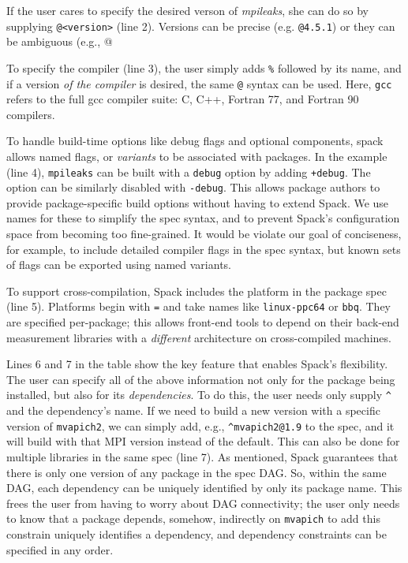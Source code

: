 \noindent
If the user cares to specify the desired verson of {\it mpileaks}, she can do so
by supplying {\tt @<version>} (line 2). Versions can be precise (e.g. {\tt @4.5.1}) or 
they can be ambiguous (e.g., @

To specify the compiler (line 3), the user
simply adds {\tt \%} followed by its name, and if a version {\it of the compiler} 
is desired, the same {\tt @} syntax can be used.  Here, {\tt gcc} refers to the full
gcc compiler suite: C, C++, Fortran 77, and Fortran 90 compilers.

To handle build-time options like debug flags and optional components, spack
allows named flags, or {\it variants} to be associated with packages.  
In the example (line 4), {\tt mpileaks} can be built with a {\tt debug} option by
adding {\tt +debug}.  The option can be similarly disabled with {\tt -debug}.  
This allows package authors to provide package-specific build options without 
having to extend Spack.  We use names for these to simplify the spec
syntax, and to prevent Spack's configuration space from becoming too fine-grained.
It would be violate our goal of conciseness, for example, to include detailed 
compiler flags in the spec syntax, but known sets of flags can be exported using
named variants.

To support cross-compilation, Spack includes the platform in the package spec (line 5).
Platforms begin with {\tt =} and take names like {\tt linux-ppc64} or {\tt bbq}.  They are
specified per-package; this allows front-end tools to depend on their back-end measurement
libraries with a {\it different} architecture on cross-compiled machines.

Lines 6 and 7 in the table show the key feature that enables Spack's flexibility.
The user can specify all of the above information not only for the package being
installed, but also for its {\it dependencies}.  To do this, the user needs only supply 
\verb|^| and the dependency's name.  If we need to build a new version with a specific
version of {\tt mvapich2}, we can simply add, e.g., \verb|^mvapich2@1.9|
to the spec, and it will build with that MPI version instead of the default.
This can also be done for multiple libraries in the same spec (line 7).  
As mentioned, Spack guarantees that there is only one version of any package in 
the spec DAG.  So, within the same DAG, each dependency can be uniquely identified by 
only its package name.  This frees the user from having to worry about DAG connectivity;
the user only needs to know that a package depends, somehow, indirectly on {\tt mvapich}
to add this constrain
uniquely identifies a dependency, and dependency constraints can be specified in any
 order.  






